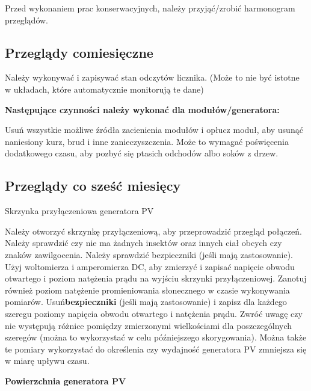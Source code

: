 \documentclass[12pt,a4paper]{article}
\begin{document}
Przed wykonaniem prac konserwacyjnych, należy przyjąć/zrobić harmonogram 
przeglądów. 

\subsection{Przeglądy comiesięczne}

Należy wykonywać i zapisywać stan odczytów licznika. (Może to nie być 
istotne w układach, które automatycznie monitorują te dane) 

\textbf{Następujące czynności należy wykonać dla modułów/generatora: }

Usuń wszystkie możliwe źródła zacienienia modułów i opłucz moduł, aby 
usunąć naniesiony kurz, brud i inne zanieczyszczenia. Może to wymagać 
poświęcenia dodatkowego czasu, aby pozbyć się ptasich odchodów albo 
soków z drzew. 

\subsection{Przeglądy co sześć miesięcy}

Skrzynka przyłączeniowa generatora PV 

Należy otworzyć skrzynkę przyłączeniową, aby przeprowadzić przegląd 
połączeń. Należy sprawdzić czy nie ma żadnych insektów oraz innych ciał 
obcych czy znaków zawilgocenia. Należy sprawdzić bezpieczniki (jeśli 
mają zastosowanie). Użyj woltomierza i amperomierza DC, aby zmierzyć i 
zapisać napięcie obwodu otwartego i poziom natężenia prądu na wyjściu 
skrzynki przyłączeniowej. Zanotuj również poziom natężenie 
promieniowania słonecznego w czasie wykonywania pomiarów. Usuń\textbf{bezpieczniki} (jeśli mają zastosowanie) i zapisz dla każdego szeregu 
poziomy napięcia obwodu otwartego i natężenia prądu. Zwróć 
uwagę czy nie występują różnice pomiędzy zmierzonymi wielkościami dla 
poszczególnych szeregów (można to wykorzystać w celu późniejszego 
skorygowania). Można także te pomiary wykorzystać do określenia czy 
wydajność generatora PV zmniejsza się w miarę upływu czasu. 

\textbf{Powierzchnia generatora PV}
\end{document}
